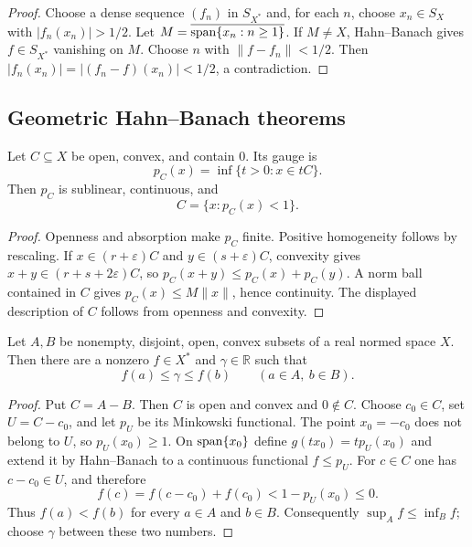 \begin{proof}
Choose a dense sequence $(f_n)$ in $S_{X^*}$ and, for each $n$, choose
$x_n\in S_X$ with $|f_n(x_n)|>1/2$.  Let
$M=\overline{\operatorname{span}\{x_n:n\ge1\}}$.  If $M\ne X$, Hahn--Banach gives
$f\in S_{X^*}$ vanishing on $M$.  Choose $n$ with $\|f-f_n\|<1/2$.
Then $|f_n(x_n)|=|(f_n-f)(x_n)|<1/2$, a contradiction.
\end{proof}

\subsection{Geometric Hahn--Banach theorems}

\begin{notedefinition}
Let $C\subseteq X$ be open, convex, and contain $0$.  Its gauge is
\[
  p_C(x)=\inf\{t>0:x\in tC\}.
\]
Then $p_C$ is sublinear, continuous, and
\[
  C=\{x:p_C(x)<1\}.
\]
\end{notedefinition}

\begin{proof}
Openness and absorption make $p_C$ finite.  Positive homogeneity follows by
rescaling.  If $x\in(r+\varepsilon)C$ and
$y\in(s+\varepsilon)C$, convexity gives
$x+y\in(r+s+2\varepsilon)C$, so
$p_C(x+y)\le p_C(x)+p_C(y)$.  A norm ball contained in $C$ gives
$p_C(x)\le M\|x\|$, hence continuity.  The displayed description of $C$
follows from openness and convexity.
\end{proof}

\begin{notetheorem}
Let $A,B$ be nonempty, disjoint, open, convex subsets of a real normed space
$X$.  Then there are a nonzero $f\in X^*$ and $\gamma\in\mathbb R$ such that
\[
  f(a)\le\gamma\le f(b)
  \qquad(a\in A,\ b\in B).
\]
\end{notetheorem}

\begin{proof}
Put $C=A-B$.  Then $C$ is open and convex and $0\notin C$.  Choose
$c_0\in C$, set $U=C-c_0$, and let $p_U$ be its Minkowski functional.  The
point $x_0=-c_0$ does not belong to $U$, so $p_U(x_0)\ge1$.  On
$\operatorname{span}\{x_0\}$ define $g(tx_0)=t p_U(x_0)$ and extend it by Hahn--Banach
to a continuous functional $f\le p_U$.  For $c\in C$ one has
$c-c_0\in U$, and therefore
\[
  f(c)=f(c-c_0)+f(c_0)<1-p_U(x_0)\le0.
\]
Thus $f(a)<f(b)$ for every $a\in A$ and $b\in B$.  Consequently
$\sup_A f\le\inf_B f$; choose $\gamma$ between these two numbers.
\end{proof}

